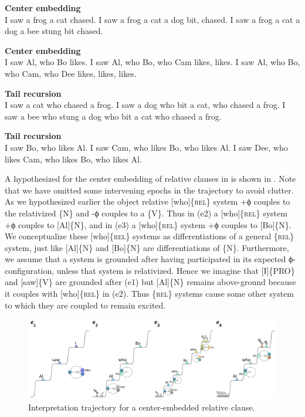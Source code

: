 \ea\label{ex:6:15}
\textbf{Center embedding}\\
    \ea I saw a frog a cat chased.                      
    \ex I saw a frog a cat a dog bit, chased.  
    \ex I saw a frog a cat a dog a bee stung bit chased.
    \z
\z

\ea\label{ex:6:16}
\textbf{Center embedding}\\
    \ea\label{ex:6:16a} I saw Al, who Bo likes.                                
    \ex\label{ex:6:16b} I saw Al, who Bo, who Cam likes, likes.                
    \ex\label{ex:6:16c} I saw Al, who Bo, who Cam, who Dee likes, likes, likes.
    \z
\z

\ea\label{ex:6:17}
\textbf{Tail recursion}\\
    \ea I saw a cat who chased a frog.
    \ex I saw a dog who bit a cat, who chased a frog.
    \ex I saw a bee who stung a dog who bit a cat who chased a frog.
    \z
\z

\ea\label{ex:6:18}
\textbf{Tail recursion}\\
    \ea I saw Bo, who likes Al.
    \ex\label{ex:6:18b} I saw Cam, who likes Bo, who likes Al.
    \ex\label{ex:6:18c} I saw Dee, who likes Cam, who likes Bo, who likes Al.
    \z
\z
  

  A hypothesized  for the center embedding of relative clauses in  is shown in {}. Note that we have omitted some intervening epochs in the trajectory to avoid clutter. As we hypothesized earlier the object relative [who]\{\textsc{rel}\} system +ϕ couples to the relativized \{N\} and -ϕ couples to a \{V\}. Thus in (e2) a [who]\{\textsc{rel}\} system +ϕ couples to [Al]\{N\}, and in (e3) a [who]\{\textsc{rel}\} system +ϕ couples to [Bo]\{N\}. We conceptualize these [who]\{\textsc{rel}\} systems as differentiations of a general \{\textsc{rel}\} system, just like [Al]\{N\} and [Bo]\{N\} are differentiations of \{N\}. Furthermore, we assume that a system is grounded after having participated in its expected ϕ-configuration, unless that system is relativized. Hence we imagine that [I]\{\textsc{PRO}\} and [saw]\{V\} are grounded after (e1) but [Al]\{N\} remains above-ground because it couples with [who]\{\textsc{rel}\} in (e2). Thus \{\textsc{rel}\} systems cause some other system to which they are coupled to remain excited.

  
\begin{figure}
\includegraphics[width=\textwidth]{figures/Tilsen-img132.png}
\caption{Interpretation trajectory for a center-embedded relative clause.}
\label{fig:6:13}
\end{figure}
 

